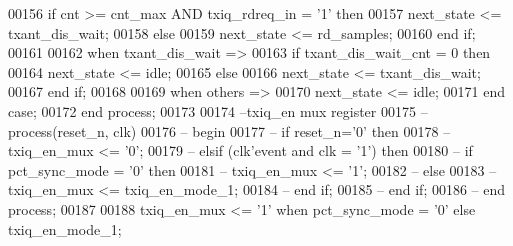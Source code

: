 \begin{DoxyCode}
00156          \textcolor{keywordflow}{if} \textcolor{vhdlchar}{cnt} \textcolor{vhdlchar}{>=} \textcolor{vhdlchar}{cnt_max} \textcolor{keywordflow}{AND} \textcolor{vhdlchar}{txiq_rdreq_in} \textcolor{vhdlchar}{=} \textcolor{vhdlchar}{'}\textcolor{vhdllogic}{}\textcolor{vhdllogic}{1}\textcolor{vhdlchar}{'} \textcolor{keywordflow}{then}
00157             \textcolor{vhdlchar}{next_state} \textcolor{vhdlchar}{<=} \textcolor{vhdlchar}{txant\_dis\_wait};
00158          \textcolor{keywordflow}{else} 
00159             \textcolor{vhdlchar}{next_state} \textcolor{vhdlchar}{<=} \textcolor{vhdlchar}{rd\_samples};
00160          \textcolor{keywordflow}{end} \textcolor{keywordflow}{if};
00161          
00162       \textcolor{keywordflow}{when} \textcolor{vhdlchar}{txant\_dis\_wait} \textcolor{vhdlchar}{=}\textcolor{vhdlchar}{>} 
00163          \textcolor{keywordflow}{if} \textcolor{vhdlchar}{txant_dis_wait_cnt} \textcolor{vhdlchar}{=} \textcolor{vhdllogic}{}\textcolor{vhdllogic}{0} \textcolor{keywordflow}{then} 
00164             \textcolor{vhdlchar}{next_state} \textcolor{vhdlchar}{<=} \textcolor{vhdlchar}{idle};
00165          \textcolor{keywordflow}{else} 
00166             \textcolor{vhdlchar}{next_state} \textcolor{vhdlchar}{<=} \textcolor{vhdlchar}{txant\_dis\_wait};
00167          \textcolor{keywordflow}{end} \textcolor{keywordflow}{if};
00168                            
00169         \textcolor{keywordflow}{when} \textcolor{keywordflow}{others} \textcolor{vhdlchar}{=}\textcolor{vhdlchar}{>} 
00170             \textcolor{vhdlchar}{next_state} \textcolor{vhdlchar}{<=} \textcolor{vhdlchar}{idle};
00171     \textcolor{keywordflow}{end} \textcolor{keywordflow}{case};
00172 \textcolor{keywordflow}{end} \textcolor{keywordflow}{process};
00173 
00174 \textcolor{keyword}{--txiq\_en mux register}
00175 \textcolor{keyword}{ -- process(reset\_n, clk)}
00176 \textcolor{keyword}{    -- begin}
00177 \textcolor{keyword}{      -- if reset\_n='0' then}
00178 \textcolor{keyword}{         -- txiq\_en\_mux <= '0';}
00179 \textcolor{keyword}{      -- elsif (clk'event and clk = '1') then}
00180 \textcolor{keyword}{         -- if pct\_sync\_mode = '0' then }
00181 \textcolor{keyword}{            -- txiq\_en\_mux <= '1';}
00182 \textcolor{keyword}{         -- else }
00183 \textcolor{keyword}{            -- txiq\_en\_mux <= txiq\_en\_mode\_1;}
00184 \textcolor{keyword}{         -- end if;}
00185 \textcolor{keyword}{      -- end if;}
00186 \textcolor{keyword}{-- end process;}
00187 
00188 \textcolor{vhdlchar}{txiq_en_mux} \textcolor{vhdlchar}{<=} \textcolor{vhdlchar}{'}\textcolor{vhdllogic}{}\textcolor{vhdllogic}{1}\textcolor{vhdlchar}{'} \textcolor{keywordflow}{when} \textcolor{vhdlchar}{pct_sync_mode} \textcolor{vhdlchar}{=} \textcolor{vhdlchar}{'}\textcolor{vhdllogic}{}\textcolor{vhdllogic}{0}\textcolor{vhdlchar}{'} \textcolor{keywordflow}{else} \textcolor{vhdlchar}{txiq_en_mode_1};

\end{DoxyCode}
